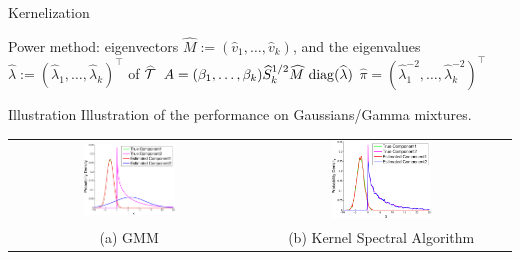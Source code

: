 \documentclass[final,t]{beamer}
\begin{document}
\begin{frame}{}
\begin{columns}[t]
\begin{column}{.3\linewidth}
\begin{block}{Kernelization}
\begin{algorithmic}[1]
            \STATE Power method: eigenvectors $\widehat M:=(\widehat v_1,\ldots,\widehat v_k)$, and the eigenvalues $\widehat \lambda := (\widehat\lambda_1,\ldots,\widehat\lambda_k)^\top$ of $\widehat {{\mathcal{T}}}$
            \STATE $A = (\beta_1,\ldots,\beta_k) \widehat  S_k^{1/2} \widehat M \, \mathop{\mathrm{diag}}(\widehat \lambda)$
            \STATE $\widehat \pi = (\widehat\lambda_1^{-2},\ldots,\widehat\lambda_k^{-2})^\top$
          \end{algorithmic}
          \hline
          \vspace{-0.15in}
     \end{block}


    \begin{block}{Illustration}
    Illustration of the performance on Gaussians/Gamma mixtures.
    \begin{center}
        \begin{tabular}{cc}
        \includegraphics[width=0.4\textwidth]{../experiment/visualization/em_visual_k_2_view_1-crop}&
        \includegraphics[width=0.4\textwidth]{../experiment/visualization/visual_k_2_view_1-crop-crop}\\
        (a) GMM & (b) Kernel Spectral Algorithm
        \end{tabular}
    \end{center}
    \vspace{-0.4in}
    \end{block}

    \end{column}


\end{columns}
\end{frame}
\end{document}
